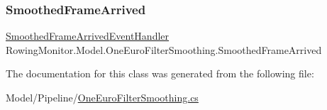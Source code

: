 \subsubsection{\texorpdfstring{Smoothed\+Frame\+Arrived}{SmoothedFrameArrived}}
{\footnotesize\ttfamily \hyperlink{class_rowing_monitor_1_1_model_1_1_one_euro_filter_smoothing_a22becc35eb5432a3a90b8e61d5c8171f}{Smoothed\+Frame\+Arrived\+Event\+Handler} Rowing\+Monitor.\+Model.\+One\+Euro\+Filter\+Smoothing.\+Smoothed\+Frame\+Arrived}



The documentation for this class was generated from the following file\+:\begin{DoxyCompactItemize}
\item 
Model/\+Pipeline/\hyperlink{_one_euro_filter_smoothing_8cs}{One\+Euro\+Filter\+Smoothing.\+cs}\end{DoxyCompactItemize}
